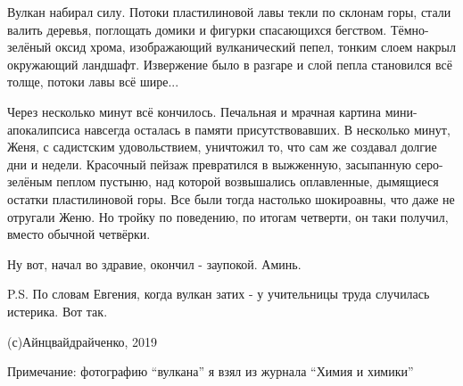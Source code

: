 Вулкан набирал силу. Потоки пластилиновой лавы текли по склонам горы, стали
валить деревья, поглощать домики и фигурки спасающихся бегством. Тёмно-зелёный
оксид хрома, изображающий вулканический пепел, тонким слоем накрыл окружающий
ландшафт. Извержение было в разгаре и слой пепла становился всё толще, потоки
лавы всё шире...

Через несколько минут всё кончилось. Печальная и мрачная картина
мини-апокалипсиса навсегда осталась в памяти присутствовавших. В несколько
минут, Женя, с садистским удовольствием, уничтожил то, что сам же создавал
долгие дни и недели. Красочный пейзаж превратился в выжженную, засыпанную
серо-зелёным пеплом пустыню, над которой возвышались оплавленные, дымящиеся
остатки пластилиновой горы. Все были тогда настолько шокироавны, что даже не
отругали Женю. Но тройку по поведению, по итогам четверти, он таки получил,
вместо обычной четвёрки.

Ну вот, начал во здравие, окончил - заупокой. Аминь.

P.S. По словам Евгения, когда вулкан затих - у учительницы труда случилась
истерика. Вот так.

(с)Айнцвайдрайченко, 2019

Примечание: фотографию \enquote{вулкана} я взял из журнала \enquote{Химия и химики}

